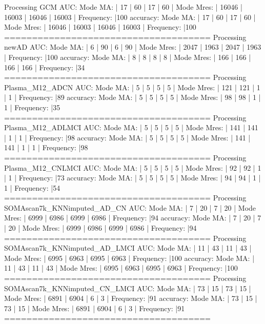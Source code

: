 Processing GCM
AUC:
	 Mode MA: | 17 | 60 | 17 | 60 |
	 Mode Mres: | 16046 | 16003 | 16046 | 16003 |
	 Frequency: |100 %
accuracy:
	 Mode MA: | 17 | 60 | 17 | 60 |
	 Mode Mres: | 16046 | 16003 | 16046 | 16003 |
	 Frequency: |100 %
=====================================
Processing newAD
AUC:
	 Mode MA: | 6 | 90 | 6 | 90 |
	 Mode Mres: | 2047 | 1963 | 2047 | 1963 |
	 Frequency: |100 %
accuracy:
	 Mode MA: | 8 | 8 | 8 | 8 |
	 Mode Mres: | 166 | 166 | 166 | 166 |
	 Frequency: |34 %
=====================================
Processing Plasma_M12_ADCN
AUC:
	 Mode MA: | 5 | 5 | 5 | 5 |
	 Mode Mres: | 121 | 121 | 1 | 1 |
	 Frequency: |89 %
accuracy:
	 Mode MA: | 5 | 5 | 5 | 5 |
	 Mode Mres: | 98 | 98 | 1 | 1 |
	 Frequency: |35 %
=====================================
Processing Plasma_M12_ADLMCI
AUC:
	 Mode MA: | 5 | 5 | 5 | 5 |
	 Mode Mres: | 141 | 141 | 1 | 1 |
	 Frequency: |98 %
accuracy:
	 Mode MA: | 5 | 5 | 5 | 5 |
	 Mode Mres: | 141 | 141 | 1 | 1 |
	 Frequency: |98 %
=====================================
Processing Plasma_M12_CNLMCI
AUC:
	 Mode MA: | 5 | 5 | 5 | 5 |
	 Mode Mres: | 92 | 92 | 1 | 1 |
	 Frequency: |73 %
accuracy:
	 Mode MA: | 5 | 5 | 5 | 5 |
	 Mode Mres: | 94 | 94 | 1 | 1 |
	 Frequency: |54 %
=====================================
Processing SOMAscan7k_KNNimputed_AD_CN
AUC:
	 Mode MA: | 7 | 20 | 7 | 20 |
	 Mode Mres: | 6999 | 6986 | 6999 | 6986 |
	 Frequency: |94 %
accuracy:
	 Mode MA: | 7 | 20 | 7 | 20 |
	 Mode Mres: | 6999 | 6986 | 6999 | 6986 |
	 Frequency: |94 %
=====================================
Processing SOMAscan7k_KNNimputed_AD_LMCI
AUC:
	 Mode MA: | 11 | 43 | 11 | 43 |
	 Mode Mres: | 6995 | 6963 | 6995 | 6963 |
	 Frequency: |100 %
accuracy:
	 Mode MA: | 11 | 43 | 11 | 43 |
	 Mode Mres: | 6995 | 6963 | 6995 | 6963 |
	 Frequency: |100 %
=====================================
Processing SOMAscan7k_KNNimputed_CN_LMCI
AUC:
	 Mode MA: | 73 | 15 | 73 | 15 |
	 Mode Mres: | 6891 | 6904 | 6 | 3 |
	 Frequency: |91 %
accuracy:
	 Mode MA: | 73 | 15 | 73 | 15 |
	 Mode Mres: | 6891 | 6904 | 6 | 3 |
	 Frequency: |91 %
=====================================
